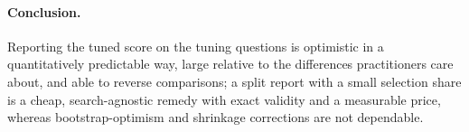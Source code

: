 \paragraph{Conclusion.}
Reporting the tuned score on the tuning questions is optimistic in a quantitatively predictable way, large relative to the differences practitioners care about, and able to reverse comparisons; a split report with a small selection share is a cheap, search-agnostic remedy with exact validity and a measurable price, whereas bootstrap-optimism and shrinkage corrections are not dependable.
